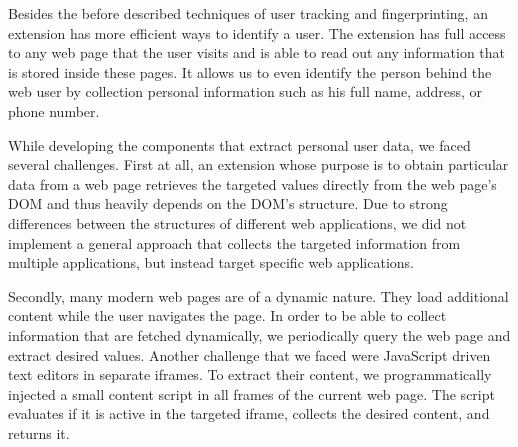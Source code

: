 	Besides the before described techniques of user tracking and fingerprinting, an extension has more efficient ways to identify a user. The extension has full access to any web page that the user visits and is able to read out any information that is stored inside these pages. It allows us to even identify the person behind the web user by collection personal information such as his full name, address, or phone number. 
	
	While developing the components that extract personal user data, we faced several challenges. First at all, an extension whose purpose is to obtain particular data from a web page retrieves the targeted values directly from the web page's DOM and thus heavily depends on the DOM's structure. Due to strong differences between the structures of different web applications, we did not implement a general approach that collects the targeted information from multiple applications, but instead target specific web applications. 
	
	Secondly, many modern web pages are of a dynamic nature. They load additional content while the user navigates the page. In order to be able to collect information that are fetched dynamically, we periodically query the web page and extract desired values. Another challenge that we faced were JavaScript driven text editors in separate iframes. To extract their content, we programmatically injected a small content script in all frames of the current web page. The script evaluates if it is active in the targeted iframe, collects the desired content, and returns it. 
	

